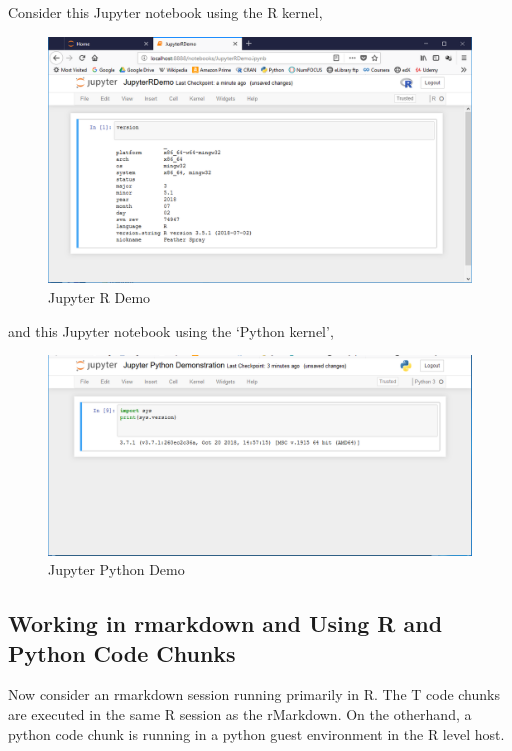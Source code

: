 \documentclass[]{book}
\theoremstyle{definition}
\theoremstyle{definition}
\theoremstyle{definition}
\theoremstyle{remark}
\begin{document}
Consider this Jupyter notebook using the R kernel,

\begin{figure}
\centering
\includegraphics{images/JupyterRSession.png}
\caption{Jupyter R Demo}
\end{figure}

and this Jupyter notebook using the `Python kernel',

\begin{figure}
\centering
\includegraphics{images/JupyterPythonSession.png}
\caption{Jupyter Python Demo}
\end{figure}

\subsection{Working in rmarkdown and Using R and Python Code
Chunks}\label{working-in-rmarkdown-and-using-r-and-python-code-chunks}

Now consider an rmarkdown session running primarily in R. The T code
chunks are executed in the same R session as the rMarkdown. On the
otherhand, a python code chunk is running in a python guest environment
in the R level host.
\end{document}
